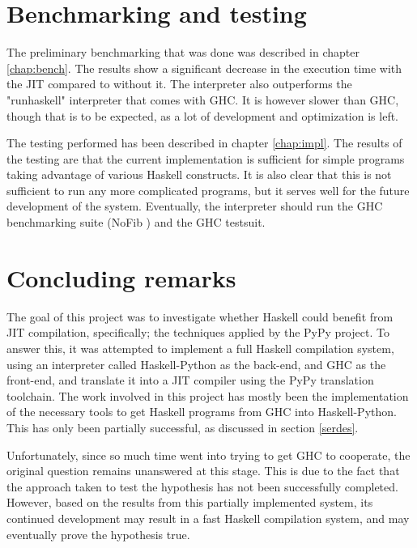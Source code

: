 \section{Benchmarking and testing}

\begin{comment}
Some simple benchmarking and testing was done. The benchmarking was done by
running the naive fibonacci program with $n=40$, the results can be seen in
table \ref{tab:benchmarks}.
It is clear that the interpreter must be optimized 
further if it is to compete with GHC. A significant increase in execution 
time with the JIT as opposed to without the JIT was observed. In addition,
for this benchmark, the interpreter with JIT was approximately $3.3$ times faster than
$runhaskell$ (an interpreter that comes with GHC).
\end{comment}

The preliminary benchmarking that was done was described in chapter \ref{chap:bench}. 
The results
show a significant decrease in the execution time with the JIT compared to without it.
The interpreter also outperforms the "runhaskell" interpreter that comes with GHC. It
is however slower than GHC, though that is to be expected, as a lot of 
development and optimization is left.

The testing performed has been described in chapter \ref{chap:impl}. The results of the 
testing are that the current implementation is sufficient for simple programs taking 
advantage of various Haskell constructs. It is also clear that this is not sufficient
to run any more complicated programs, but it serves well for the future development of
the system. Eventually, the interpreter should run the GHC benchmarking suite 
(NoFib \cite{partain1992nofib}) and the GHC testsuit.

\section{Concluding remarks}


The goal of this project was to investigate whether Haskell could benefit from JIT 
compilation, specifically; the techniques applied by the PyPy project. 
To answer this, it was attempted to implement a full Haskell compilation
system, using an interpreter called Haskell-Python\cite{haskellpython} as the back-end,
and GHC as the front-end, and translate it into a JIT compiler using the PyPy translation
toolchain. The work involved in this project has mostly been the implementation of the necessary
tools to get Haskell programs from GHC into Haskell-Python. This has only been partially
successful, as discussed in section \ref{serdes}.

Unfortunately, since so much time went into trying to get GHC to cooperate, 
the original question remains unanswered at this stage. This is due to the fact that the
approach taken to test the hypothesis has not been successfully completed. However,
based on the results from this partially implemented system, its continued
development may result in a fast Haskell compilation system, and may eventually prove
the hypothesis true.

